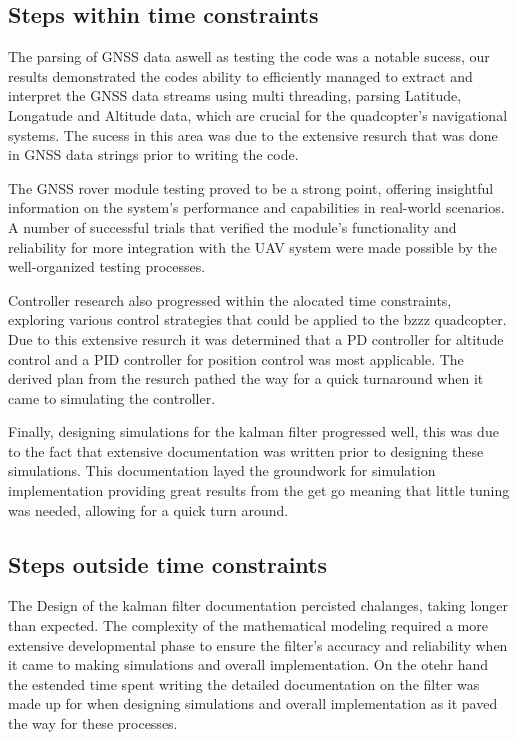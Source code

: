 \documentclass{report}
\begin{document}
\subsection*{Steps within time constraints}
The parsing of GNSS data aswell as testing the code was a notable sucess, our
results demonstrated the codes ability to efficiently managed to extract and
interpret the GNSS data streams using multi threading, parsing Latitude,
Longatude and  Altitude data, which are crucial for the quadcopter's
navigational systems. The sucess in this area was due to the extensive resurch
that was done in GNSS data strings prior to writing the code.

The GNSS rover module testing proved to be a strong point, offering insightful
information on the system's performance and capabilities in real-world
scenarios. A number of successful trials that verified the module's
functionality and reliability for more integration with the UAV system were
made possible by the well-organized testing processes.

Controller research also progressed within the alocated time constraints,
exploring various control strategies that could be applied to the bzzz
quadcopter. Due to this extensive resurch it was determined that a PD controller
for altitude control and a PID controller for position control was most
applicable. The derived plan from the resurch pathed the way for a quick
turnaround when it came to simulating the controller. 

Finally, designing simulations for the kalman filter progressed well, this was
due to the fact that extensive documentation was written prior to designing
these simulations. This documentation layed the groundwork for simulation
implementation providing great results from the get go meaning that little
tuning was needed, allowing for a quick turn around. 

\subsection*{Steps outside time constraints}
The Design of the kalman filter documentation percisted chalanges, taking longer
than expected. The complexity of the mathematical modeling required a more
extensive developmental phase to ensure the filter's accuracy and reliability
when it came to making simulations and overall implementation. On the otehr hand
the estended time spent writing the detailed documentation on the filter was
made up for when designing simulations and overall implementation as it paved
the way for these processes. 
\end{document}
